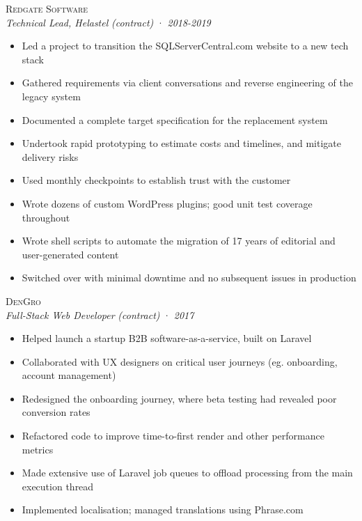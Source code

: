 \documentclass[a4paper,10pt]{article}
\newcommand{\resumeSubheading}[5][12pt]{
  \vspace{#1}
  {\scshape{#2}} \\
  \textit{\small{#3}} \textit{\small{(#4)}} · \textit{\small{#5}}
  \vspace{2pt}
}
\newcommand{\resumeListStart}{\begin{itemize}}
\newcommand{\resumeListEnd}{\end{itemize}}
\newcommand{\resumeItem}[1]{
  \item[\-·]\small{{#1\vspace{1pt}}}
}
\begin{document}
  \begin{minipage}{\textwidth}
    \resumeSubheading
      {Redgate Software}
      {Technical Lead, Helastel}
      {contract}
      {2018-2019}
    \resumeListStart
      \resumeItem{Led a project to transition the SQLServerCentral.com website to a new tech stack}
      \resumeItem{Gathered requirements via client conversations and reverse engineering of the legacy system}
      \resumeItem{Documented a complete target specification for the replacement system}
      \resumeItem{Undertook rapid prototyping to estimate costs and timelines, and mitigate delivery risks}
      \resumeItem{Used monthly checkpoints to establish trust with the customer}
      \resumeItem{Wrote dozens of custom WordPress plugins; good unit test coverage throughout}
      \resumeItem{Wrote shell scripts to automate the migration of 17 years of editorial and user-generated content}
      \resumeItem{Switched over with minimal downtime and no subsequent issues in production}
    \resumeListEnd
  \end{minipage}


  \begin{minipage}{\textwidth}
    \resumeSubheading
      {DenGro}
      {Full-Stack Web Developer}
      {contract}
      {2017}
    \resumeListStart
      \resumeItem{Helped launch a startup B2B software-as-a-service, built on Laravel}
      \resumeItem{Collaborated with UX designers on critical user journeys (eg. onboarding, account management)}
      \resumeItem{Redesigned the onboarding journey, where beta testing had revealed poor conversion rates}
      \resumeItem{Refactored code to improve time-to-first render and other performance metrics}
      \resumeItem{Made extensive use of Laravel job queues to offload processing from the main execution thread}
      \resumeItem{Implemented localisation; managed translations using Phrase.com }
    \resumeListEnd
  \end{minipage}
\end{document}
